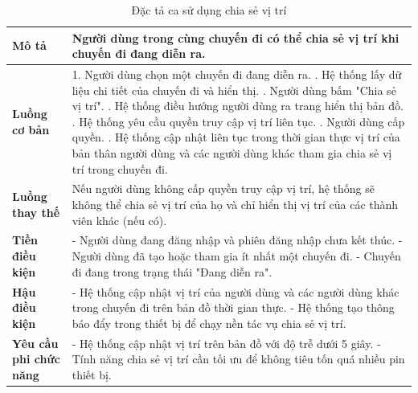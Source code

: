 \begin{longtable}{| p{4cm} | p{\dimexpr\linewidth-4cm-4\tabcolsep} |} %
    \caption{Đặc tả ca sử dụng chia sẻ vị trí} %
    \label{tab:uc_share_location_spec} \\ %

    \hline
    \textbf{Mô tả} & Người dùng trong cùng chuyến đi có thể chia sẻ vị trí khi chuyến đi đang diễn ra. \\
    \hline
    \endfirsthead %



    \hline %
    \endlastfoot

    \textbf{Luồng cơ bản} & 1. Người dùng chọn một chuyến đi đang diễn ra. \newline
                           2. Hệ thống lấy dữ liệu chi tiết của chuyến đi và hiển thị. \newline
                           3. Người dùng bấm "Chia sẻ vị trí". \newline
                           4. Hệ thống điều hướng người dùng ra trang hiển thị bản đồ. \newline
                           5. Hệ thống yêu cầu quyền truy cập vị trí liên tục. \newline
                           6. Người dùng cấp quyền. \newline
                           7. Hệ thống cập nhật liên tục trong thời gian thực vị trí của bản thân người dùng và các người dùng khác tham gia chia sẻ vị trí trong chuyến đi. \\
    \hline
    \textbf{Luồng thay thế} & Nếu người dùng không cấp quyền truy cập vị trí, hệ thống sẽ không thể chia sẻ vị trí của họ và chỉ hiển thị vị trí của các thành viên khác (nếu có). \\
    \hline
    \textbf{Tiền điều kiện} & - Người dùng đang đăng nhập và phiên đăng nhập chưa kết thúc.\newline
                           - Người dùng đã tạo hoặc tham gia ít nhất một chuyến đi. \newline
                           - Chuyến đi đang trong trạng thái "Đang diễn ra". \\
    \hline
    \textbf{Hậu điều kiện} & - Hệ thống cập nhật vị trí của người dùng và các người dùng khác trong chuyến đi trên bản đồ thời gian thực. \newline
                           - Hệ thống tạo thông báo đẩy trong thiết bị để chạy nền tác vụ chia sẻ vị trí. \\
    \hline
    \textbf{Yêu cầu phi chức năng} & - Hệ thống cập nhật vị trí trên bản đồ với độ trễ dưới 5 giây. \newline
                                   - Tính năng chia sẻ vị trí cần tối ưu để không tiêu tốn quá nhiều pin thiết bị. \\

\end{longtable}
